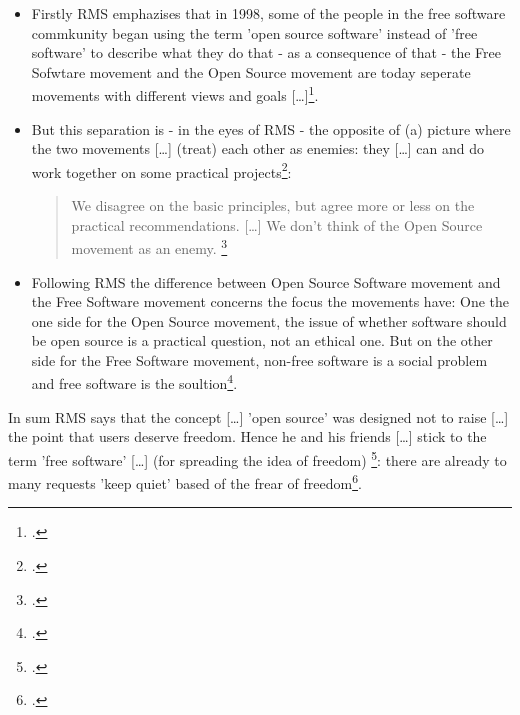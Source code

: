\documentclass[DIV=calc,BCOR=5mm,11pt,headings=small,oneside,abstract=true, toc=bib]{scrartcl}
\begin{document}
\begin{itemize}
  \item Firstly RMS emphazises that \glqq{}in 1998, some of the people in
  the free software commkunity began using the term 'open source software'
  instead of 'free software' to describe what they do\grqq{} that - as a
  consequence of that - \glqq{}the Free Sofwtare movement and the Open
  Source movement are today seperate movements with different views and
  goals [\ldots]\grqq{}\footcite[cf][55]{Stallman1998a}.
  \item But this separation is - in the eyes of RMS - \glqq{}the opposite
  of (a) picture\grqq{} where the two movements \glqq{}[\ldots] (treat)
  each other as enemies\grqq{}: they \glqq{}[\ldots] can and do work
  together on some practical projects\grqq{}\footcite[cf][55]{Stallman1998a}:
  \begin{quote}
  \glqq{}We disagree on the basic principles, but agree more or less on the
  practical recommendations. [\ldots] We don't think of the Open Source movement
  as an enemy.
  \grqq{}\footcite[][55]{Stallman1998a}
  \end{quote}
  \item Following RMS the difference between Open Source Software movement and
  the Free Software movement concerns the focus the movements have: One the one
  side \glqq{}for the Open Source movement, the issue of whether software
  should be open source is a practical question, not an ethical one\grqq{}. But
  on the other side \glqq{}for the Free Software movement, non-free
  software is a social problem and free software is the
  soultion\grqq{}\footcite[][55]{Stallman1998a}.
\end{itemize}

In sum RMS says that the concept \glqq{}[\ldots] 'open source' was
designed not to raise [\ldots] the point that users deserve freedom\grqq{}.
Hence he and his friends \glqq{}[\ldots] stick to the term 'free
software' [\ldots] (for spreading the idea of freedom)
\grqq{}\footcite[][59]{Stallman1998a}: there are already to many requests
\glqq{}'keep quiet'\grqq{} based of the \glqq{}frear of
freedom\grqq{}\footcite[][57]{Stallman1998a}.

\small

\end{document}
